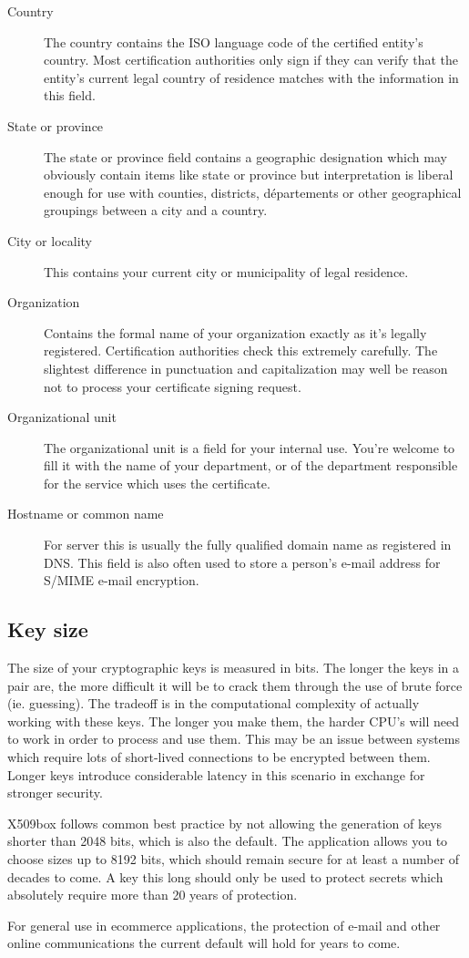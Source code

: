 \documentclass[a4paper,12pt]{article}
\begin{document}
\begin{description}
\item[Country]The country contains the ISO language code of the certified entity's country. Most certification authorities only sign if they can verify that the entity's current legal country of residence matches with the information in this field.
\item[State or province]The state or province field contains a geographic designation which may obviously contain items like state or province but interpretation is liberal enough for use with counties, districts, départements or other geographical groupings between a city and a country.
\item[City or locality]This contains your current city or municipality of legal residence.
\item[Organization]Contains the formal name of your organization exactly as it's legally registered. Certification authorities check this extremely carefully. The slightest difference in punctuation and capitalization may well be reason not to process your certificate signing request.
\item[Organizational unit]The organizational unit is a field for your internal use. You're welcome to fill it with the name of your department, or of the department responsible for the service which uses the certificate.
\item[Hostname or common name]For server this is usually the fully qualified domain name as registered in DNS. This field is also often used to store a person's e-mail address for S/MIME e-mail encryption.
\end{description}

\subsection{Key size}
The size of your cryptographic keys is measured in bits. The longer the keys in a pair are, the more difficult it will be to crack them through the use of brute force (ie. guessing). The tradeoff is in the computational complexity of actually working with these keys. The longer you make them, the harder CPU's will need to work in order to process and use them. This may be an issue between systems which require lots of short-lived connections to be encrypted between them. Longer keys introduce considerable latency in this scenario in exchange for stronger security.

X509box follows common best practice by not allowing the generation of keys shorter than 2048 bits, which is also the default. The application allows you to choose sizes up to 8192 bits, which should remain secure for at least a number of decades to come. A key this long should only be used to protect secrets which absolutely require more than 20 years of protection.

For general use in ecommerce applications, the protection of e-mail and other online communications the current default will hold for years to come.
\end{document}

